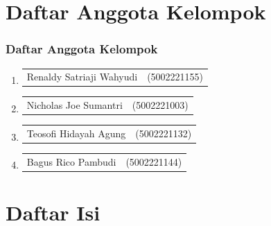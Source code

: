 \documentclass[10pt]{beamer}
\begin{document}
\section{Daftar Anggota Kelompok}

{
    \begin{frame}
        \frametitle{Daftar Anggota Kelompok}
        \begin{enumerate}
          
            \item \begin{tabularx}{\linewidth}{@{}>{\raggedright\arraybackslash}X>{\raggedleft\arraybackslash}X@{}}
                Renaldy Satriaji Wahyudi & (5002221155) \\
            \end{tabularx}
            \item \begin{tabularx}{\linewidth}{@{}>{\raggedright\arraybackslash}X>{\raggedleft\arraybackslash}X@{}}
                Nicholas Joe Sumantri & (5002221003) \\
            \end{tabularx}
            \item \begin{tabularx}{\linewidth}{@{}>{\raggedright\arraybackslash}X>{\raggedleft\arraybackslash}X@{}}
                Teosofi Hidayah Agung & (5002221132) \\
            \end{tabularx}
            \item \begin{tabularx}{\linewidth}{@{}>{\raggedright\arraybackslash}X>{\raggedleft\arraybackslash}X@{}}
                Bagus Rico Pambudi & (5002221144) \\
            \end{tabularx}
        \end{enumerate}
    \end{frame}
}

\section{Daftar Isi}
\end{document}
